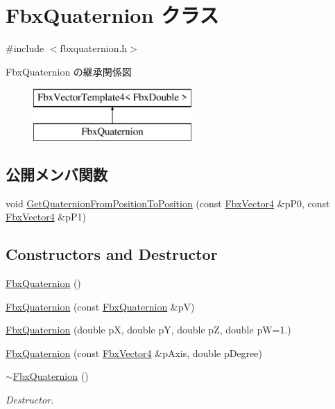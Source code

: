 \hypertarget{class_fbx_quaternion}{}\section{Fbx\+Quaternion クラス}
\label{class_fbx_quaternion}


{\ttfamily \#include $<$fbxquaternion.\+h$>$}

Fbx\+Quaternion の継承関係図\begin{figure}[H]
\begin{center}
\leavevmode
\includegraphics[height=2.000000cm]{class_fbx_quaternion}
\end{center}
\end{figure}
\subsection*{公開メンバ関数}
\begin{DoxyCompactItemize}
\item 
void \hyperlink{class_fbx_quaternion_ae81b85793e46d5a69d2aaed1be7e403e}{Get\+Quaternion\+From\+Position\+To\+Position} (const \hyperlink{class_fbx_vector4}{Fbx\+Vector4} \&p\+P0, const \hyperlink{class_fbx_vector4}{Fbx\+Vector4} \&p\+P1)
\end{DoxyCompactItemize}
\subsection*{Constructors and Destructor}
\begin{DoxyCompactItemize}
\item 
\hyperlink{class_fbx_quaternion_acfb222e84428e32ecc6258f1d18fc92b}{Fbx\+Quaternion} ()
\item 
\hyperlink{class_fbx_quaternion_ab7bef8e0e53bb3b70cf9f290ce315f50}{Fbx\+Quaternion} (const \hyperlink{class_fbx_quaternion}{Fbx\+Quaternion} \&pV)
\item 
\hyperlink{class_fbx_quaternion_ab5e4be6b3c78205ac8d0da97b6c53998}{Fbx\+Quaternion} (double pX, double pY, double pZ, double pW=1.)
\item 
\hyperlink{class_fbx_quaternion_a96686af15a5328f30dd098168480ada2}{Fbx\+Quaternion} (const \hyperlink{class_fbx_vector4}{Fbx\+Vector4} \&p\+Axis, double p\+Degree)
\item 
\hyperlink{class_fbx_quaternion_a87fbbab5cf65d9721289aec5a11444f3}{$\sim$\+Fbx\+Quaternion} ()
\begin{DoxyCompactList}\small\item\em Destructor. \end{DoxyCompactList}\end{DoxyCompactItemize}
